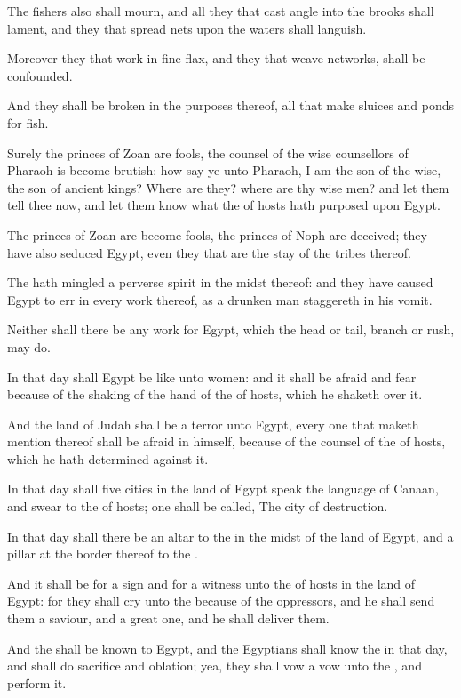 \verse The fishers also shall mourn, and all they that cast angle into the brooks shall lament, and they that spread nets upon the waters shall languish.

\verse Moreover they that work in fine flax, and they that weave networks, shall be confounded.

\verse And they shall be broken in the purposes thereof, all that make sluices and ponds for fish.

\verse Surely the princes of Zoan are fools, the counsel of the wise counsellors of Pharaoh is become brutish: how say ye unto Pharaoh, I am the son of the wise, the son of ancient kings?  \verse Where are they? where are thy wise men? and let them tell thee now, and let them know what the \LORD of hosts hath purposed upon Egypt.

\verse The princes of Zoan are become fools, the princes of Noph are deceived; they have also seduced Egypt, even they that are the stay of the tribes thereof.

\verse The \LORD hath mingled a perverse spirit in the midst thereof: and they have caused Egypt to err in every work thereof, as a drunken man staggereth in his vomit.

\verse Neither shall there be any work for Egypt, which the head or tail, branch or rush, may do.

\verse In that day shall Egypt be like unto women: and it shall be afraid and fear because of the shaking of the hand of the \LORD of hosts, which he shaketh over it.

\verse And the land of Judah shall be a terror unto Egypt, every one that maketh mention thereof shall be afraid in himself, because of the counsel of the \LORD of hosts, which he hath determined against it.

\verse In that day shall five cities in the land of Egypt speak the language of Canaan, and swear to the \LORD of hosts; one shall be called, The city of destruction.

\verse In that day shall there be an altar to the \LORD in the midst of the land of Egypt, and a pillar at the border thereof to the \LORD.

\verse And it shall be for a sign and for a witness unto the \LORD of hosts in the land of Egypt: for they shall cry unto the \LORD because of the oppressors, and he shall send them a saviour, and a great one, and he shall deliver them.

\verse And the \LORD shall be known to Egypt, and the Egyptians shall know the \LORD in that day, and shall do sacrifice and oblation; yea, they shall vow a vow unto the \LORD, and perform it.

